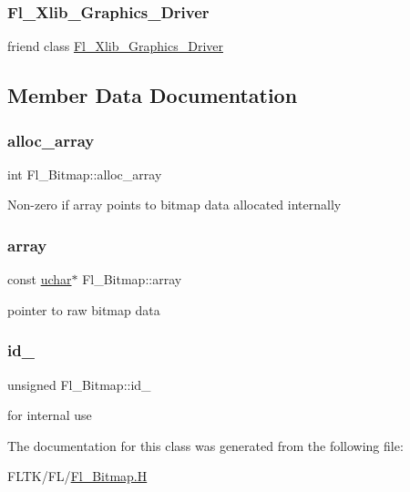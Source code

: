 \subsubsection{\texorpdfstring{Fl\+\_\+\+Xlib\+\_\+\+Graphics\+\_\+\+Driver}{Fl\_Xlib\_Graphics\_Driver}}
{\footnotesize\ttfamily friend class \hyperlink{class_fl___xlib___graphics___driver}{Fl\+\_\+\+Xlib\+\_\+\+Graphics\+\_\+\+Driver}\hspace{0.3cm}{\ttfamily [friend]}}



\subsection{Member Data Documentation}
\mbox{\label{class_fl___bitmap_a5ff5bdc4e093728d84f2fcbce76a4aba}} 
\subsubsection{\texorpdfstring{alloc\+\_\+array}{alloc\_array}}
{\footnotesize\ttfamily int Fl\+\_\+\+Bitmap\+::alloc\+\_\+array}

Non-\/zero if array points to bitmap data allocated internally \mbox{\label{class_fl___bitmap_a2fe6a97b247740b5e0a2723818e69504}} 
\subsubsection{\texorpdfstring{array}{array}}
{\footnotesize\ttfamily const \hyperlink{fl__types_8h_a65f85814a8290f9797005d3b28e7e5fc}{uchar}$\ast$ Fl\+\_\+\+Bitmap\+::array}

pointer to raw bitmap data \mbox{\label{class_fl___bitmap_a30fc9af3a50a483b6d1cdd7389ae8d1d}} 
\subsubsection{\texorpdfstring{id\+\_\+}{id\_}}
{\footnotesize\ttfamily unsigned Fl\+\_\+\+Bitmap\+::id\+\_\+\hspace{0.3cm}{\ttfamily [private]}}

for internal use 

The documentation for this class was generated from the following file\+:\begin{DoxyCompactItemize}
\item 
F\+L\+T\+K/\+F\+L/\hyperlink{_fl___bitmap_8_h}{Fl\+\_\+\+Bitmap.\+H}\end{DoxyCompactItemize}
